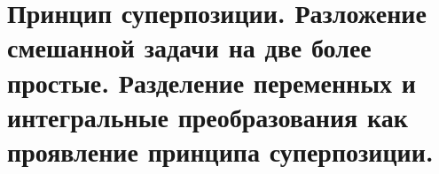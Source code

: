 \section{Принцип суперпозиции. Разложение смешанной задачи на две более
простые. Разделение переменных и интегральные преобразования как проявление
принципа суперпозиции.}

\newpage
